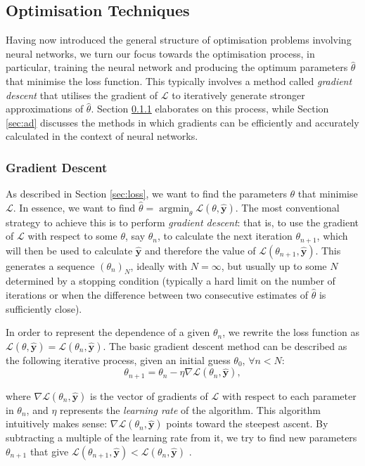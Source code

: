 \documentclass[a4paper,11pt,titlepage]{article}
\DeclareMathOperator*{\argmin}{argmin}
\theoremstyle{definition}
\theoremstyle{plain}
\theoremstyle{remark}
\begin{document}
\subsection{Optimisation Techniques}
\label{sec:opttech}

Having now introduced the general structure of optimisation problems involving neural networks, we turn our focus towards the optimisation process, in particular, training the neural network and producing the optimum parameters $\hat{\theta}$ that minimise the loss function. This typically involves a method called \textit{gradient descent} that utilises the gradient of $\mathcal{L}$ to iteratively generate stronger approximations of $\hat{\theta}$. Section \ref{sec:gd} elaborates on this process, while Section \ref{sec:ad} discusses the methods in which gradients can be efficiently and accurately calculated in the context of neural networks.

\subsubsection{Gradient Descent}
\label{sec:gd}

As described in Section \ref{sec:loss}, we want to find the parameters $\theta$ that minimise $\mathcal{L}$. In essence, we want to find $\hat{\theta} = \argmin_\theta \mathcal{L}(\theta, \mathbf{\hat{y}}) $. The most conventional strategy to achieve this is to perform \textit{gradient descent}: that is, to use the gradient of $\mathcal{L}$ with respect to some $\theta$, say $\theta_n$, to calculate the next iteration $\theta_{n+1}$, which will then be used to calculate $\mathbf{\hat{y}}$ and therefore the value of $\mathcal{L}(\theta_{n+1}, \mathbf{\hat{y}})$. This generates a sequence $(\theta_n)_N$, ideally with $N = \infty$, but usually up to some $N$ determined by a stopping condition (typically a hard limit on the number of iterations or when the difference between two consecutive estimates of $\hat{\theta}$ is sufficiently close). 

In order to represent the dependence of a given $\theta_n$, we rewrite the loss function as $\mathcal{L}(\theta,\mathbf{\hat{y}}) = \mathcal{L}(\theta_n, \mathbf{\hat{y}})$. The basic gradient descent method can be described as the following iterative process, given an initial guess $\theta_0$, $\forall n < N$:
$$\theta_{n+1} = \theta_n - \eta \nabla\mathcal{L}(\theta_n, \mathbf{\hat{y}}),$$

where $\nabla\mathcal{L}(\theta_n, \mathbf{\hat{y}})$ is the vector of gradients of $\mathcal{L}$ with respect to each parameter in $\theta_n$, and $\eta$ represents the \textit{learning rate} of the algorithm. This algorithm intuitively makes sense: $\nabla\mathcal{L}(\theta_n, \mathbf{\hat{y}})$ points toward the steepest ascent. By subtracting a multiple of the learning rate from it, we try to find new parameters $\theta_{n+1}$ that give $\mathcal{L}(\theta_{n+1}, \mathbf{\hat{y}}) < \mathcal{L}(\theta_{n}, \mathbf{\hat{y}})$ \cite{nazarathy2021}.
\end{document}
